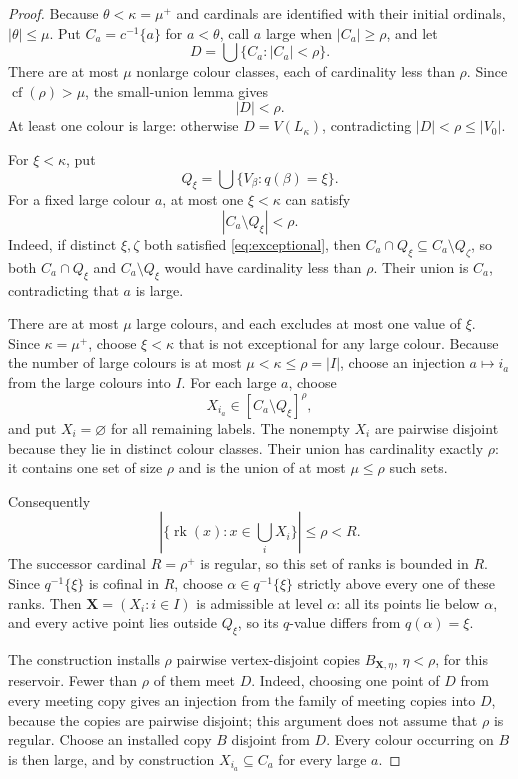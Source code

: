 \documentclass[11pt]{amsart}
\theoremstyle{definition}
\theoremstyle{remark}
\numberwithin{equation}{section}
\DeclareMathOperator{\rk}{rk}
\DeclareMathOperator{\cf}{cf}
\begin{document}
\begin{proof}
Because $\theta<\kappa=\mu^+$ and cardinals are identified with their
initial ordinals, $|\theta|\le\mu$.  Put $C_a=c^{-1}\{a\}$ for
$a<\theta$, call $a$ large when $|C_a|\ge\rho$, and let
\[
 D=\bigcup\{C_a:|C_a|<\rho\}.
\]
There are at most $\mu$ nonlarge colour classes, each of cardinality less
than $\rho$.  Since $\cf(\rho)>\mu$, the small-union lemma gives
\begin{equation}
 |D|<\rho.
 \label{eq:D-small}
\end{equation}
At least one colour is large: otherwise $D=V(L_\kappa)$, contradicting
$|D|<\rho\le|V_0|$.

For $\xi<\kappa$, put
\[
 Q_\xi=\bigcup\{V_\beta:q(\beta)=\xi\}.
\]
For a fixed large colour $a$, at most one $\xi<\kappa$ can satisfy
\begin{equation}
 |C_a\setminus Q_\xi|<\rho.
 \label{eq:exceptional}
\end{equation}
Indeed, if distinct $\xi,\zeta$ both satisfied
\eqref{eq:exceptional}, then
$C_a\cap Q_\xi\subseteq C_a\setminus Q_\zeta$, so both
$C_a\cap Q_\xi$ and $C_a\setminus Q_\xi$ would have cardinality less
than $\rho$.  Their union is $C_a$, contradicting that $a$ is large.

There are at most $\mu$ large colours, and each excludes at most one value
of $\xi$.  Since $\kappa=\mu^+$, choose $\xi<\kappa$ that is not
exceptional for any large colour.  Because the number of large colours is
at most $\mu<\kappa\le\rho=|I|$, choose an injection $a\mapsto i_a$
from the large colours into $I$.  For each large $a$, choose
\[
 X_{i_a}\in[C_a\setminus Q_\xi]^\rho,
\]
and put $X_i=\varnothing$ for all remaining labels.  The nonempty
$X_i$ are pairwise disjoint because they lie in distinct colour classes.
Their union has cardinality exactly $\rho$: it contains one set of size
$\rho$ and is the union of at most $\mu\le\rho$ such sets.

Consequently
\[
 \left|\{\rk(x):x\in\bigcup_iX_i\}\right|\le\rho<R.
\]
The successor cardinal $R=\rho^+$ is regular, so this set of ranks is
bounded in $R$.  Since $q^{-1}\{\xi\}$ is cofinal in $R$, choose
$\alpha\in q^{-1}\{\xi\}$ strictly above every one of these ranks.
Then $\mathbf X=(X_i:i\in I)$ is admissible at level $\alpha$: all its
points lie below $\alpha$, and every active point lies outside $Q_\xi$,
so its $q$-value differs from $q(\alpha)=\xi$.

The construction installs $\rho$ pairwise vertex-disjoint copies
$B_{\mathbf X,\eta}$, $\eta<\rho$, for this reservoir.  Fewer than
$\rho$ of them meet $D$.  Indeed, choosing one point of $D$ from every
meeting copy gives an injection from the family of meeting copies into
$D$, because the copies are pairwise disjoint; this argument does not
assume that $\rho$ is regular.  Choose an installed copy $B$ disjoint
from $D$.  Every colour occurring on $B$ is then large, and by
construction $X_{i_a}\subseteq C_a$ for every large $a$.
\end{proof}
\end{document}
